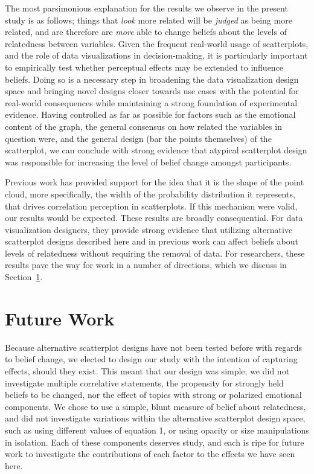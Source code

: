 \documentclass[manuscript,screen,review,anonymous]{acmart}
\begin{document}
The most parsimonious explanation for the results we observe in the
present study is as follows; things that \emph{look} more related will
be \emph{judged} as being more related, and are therefore are
\emph{more} able to change beliefs about the levels of relatedness
between variables. Given the frequent real-world usage of scatterplots,
and the role of data visualizations in decision-making, it is
particularly important to empirically test whether perceptual effects
may be extended to influence beliefs. Doing so is a necessary step in
broadening the data visualization design space and bringing novel
designs closer towards use cases with the potential for real-world
consequences while maintaining a strong foundation of experimental
evidence. Having controlled as far as possible for factors such as the
emotional content of the graph, the general consensus on how related the
variables in question were, and the general design (bar the points
themselves) of the scatterplot, we can conclude with strong evidence
that atypical scatterplot design was responsible for increasing the
level of belief change amongst participants.

Previous work has provided support for the idea that it is the shape of
the point cloud, more specifically, the width of the probability
distribution it represents, that drives correlation perception in
scatterplots. If this mechanism were valid, our results would be
expected. These results are broadly consequential. For data
visualization designers, they provide strong evidence that utilizing
alternative scatterplot designs described here and in previous work can
affect beliefs about levels of relatedness without requiring the removal
of data. For researchers, these results pave the way for work in a
number of directions, which we discuss in Section~\ref{sec-future-work}.

\section{Future Work}\label{sec-future-work}

Because alternative scatterplot designs have not been tested before with
regards to belief change, we elected to design our study with the
intention of capturing effects, should they exist. This meant that our
design was simple; we did not investigate multiple correlative
statements, the propensity for strongly held beliefs to be changed, nor
the effect of topics with strong or polarized emotional components. We
chose to use a simple, blunt measure of belief about relatedness, and
did not investigate variations within the alternative scatterplot design
space, such as using different values of equation 1, or using opacity or
size manipulations in isolation. Each of these components deserves
study, and each is ripe for future work to investigate the contributions
of each factor to the effects we have seen here.
\end{document}
